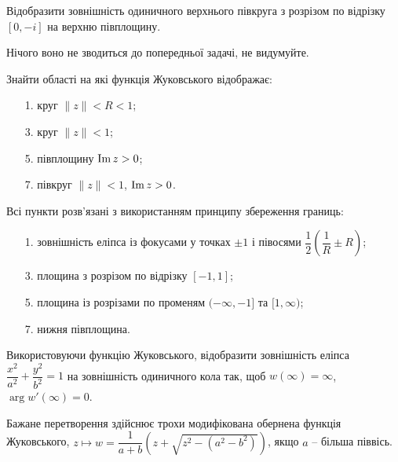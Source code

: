 \begin{problem}[Волковиський, 2.103]
    Відобразити зовнішність одиничного верхнього півкруга з розрізом по відрізку $[0,-i]$ на верхню півплощину.
\end{problem}

\begin{solution}
    Нічого воно не зводиться до попередньої задачі, не видумуйте.
\end{solution}

\begin{problem}[Волковиський, 2.107]
    Знайти області на які функція Жуковського відображає:
    \begin{enumerate}
        \item [1.] круг $\|z\| < R < 1$;
        \item [3.] круг $\|z\| < 1$;
        \item [5.] півплощину $\operatorname{Im} z > 0$;
        \item [7.] півкруг $\|z\|<1$, $\operatorname{Im} z > 0$.
    \end{enumerate}
\end{problem}

\begin{solution}
    Всі пункти розв'язані з використанням принципу збереження границь:
    \begin{enumerate}
        \item [1.] зовнішність еліпса із фокусами у точках $\pm1$ і півосями $\dfrac12\left(\dfrac1R\pm R\right)$;
        \item [3.] площина з розрізом по відрізку $[-1, 1]$;
        \item [5.] площина із розрізами по променям $(-\infty, -1]$ та $[1, \infty)$;
        \item [7.] нижня півплощина.
    \end{enumerate}
\end{solution}

\begin{problem}[Волковиський, 2.109.2]
    Використовуючи функцію Жуковського, відобразити зовнішність еліпса $\dfrac{x^2}{a^2} + \dfrac{y^2}{b^2} = 1$ на зовнішність одиничного кола так, щоб $w(\infty) = \infty$, $\arg w'(\infty) = 0$.
\end{problem}

\begin{solution}
    Бажане перетворення здійснює трохи модифікована обернена функція Жуковського, $z \mapsto w = \dfrac{1}{a+b}\left(z + \sqrt{z^2 - (a^2 - b^2)}\right)$, якщо $a$ -- більша піввісь.
\end{solution}

